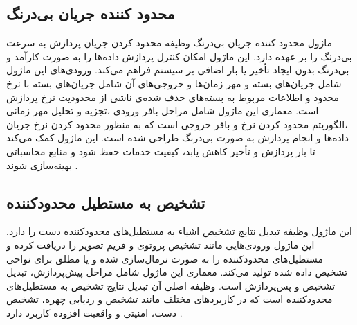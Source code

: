 \subsection{محدود کننده جریان بی‌درنگ\protect{}}
ماژول محدود کننده جریان بی‌درنگ وظیفه محدود کردن جریان پردازش به سرعت بی‌درنگ را بر عهده دارد. این ماژول امکان کنترل پردازش داده‌ها را به صورت کارآمد و بی‌درنگ بدون ایجاد تأخیر یا بار اضافی 
بر سیستم فراهم می‌کند.  ورودی‌های این ماژول شامل جریان‌های بسته و مهر زمان‌ها  و خروجی‌های آن شامل جریان‌های بسته با نرخ محدود و اطلاعات مربوط به 
بسته‌های حذف شده‌ی ناشی از محدودیت نرخ پردازش است. معماری این ماژول شامل مراحل بافر ورودی ،تجزیه و تحلیل مهر زمانی ،الگوریتم محدود کردن نرخ  و
بافر خروجی است که به منظور محدود کردن نرخ جریان داده‌ها و انجام پردازش به صورت بی‌درنگ طراحی شده است. این ماژول کمک می‌کند تا بار پردازش و تأخیر کاهش یابد، کیفیت خدمات حفظ شود و منابع محاسباتی بهینه‌سازی شوند \cite{zhang2020mediapipe}.

\subsection{تشخیص به مستطیل محدودکننده\protect{}}
این ماژول وظیفه تبدیل نتایج تشخیص اشیاء به مستطیل‌های محدودکننده دست را دارد. این ماژول ورودی‌هایی مانند تشخیص پروتوی و فریم تصویر را دریافت کرده و مستطیل‌های محدودکننده را به صورت 
نرمال‌سازی شده و یا مطلق برای نواحی تشخیص داده شده تولید می‌کند. معماری این ماژول شامل مراحل  پیش‌پردازش، تبدیل تشخیص و پس‌پردازش است. وظیفه اصلی آن تبدیل نتایج تشخیص به 
مستطیل‌های محدودکننده است که در کاربردهای مختلف مانند تشخیص و ردیابی چهره، تشخیص دست، امنیتی و واقعیت افزوده کاربرد دارد \cite{zhang2020mediapipe}.


